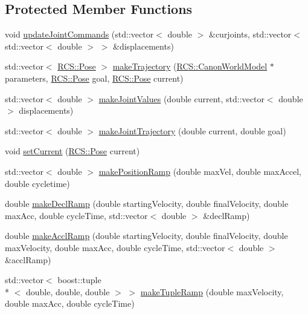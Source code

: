 \subsection*{Protected Member Functions}
\begin{DoxyCompactItemize}
\item 
void \hyperlink{classTrajectoryMaker_a59aedc924ba9fe197779bdd7c53ae97d}{update\-Joint\-Commands} (std\-::vector$<$ double $>$ \&curjoints, std\-::vector$<$ std\-::vector$<$ double $>$ $>$ \&displacements)
\item 
std\-::vector$<$ \hyperlink{namespaceRCS_aa07e45d8a50e30064283d2b38087f999}{R\-C\-S\-::\-Pose} $>$ \hyperlink{classTrajectoryMaker_a1d847a506d83927b677f7c123bebdf08}{make\-Trajectory} (\hyperlink{structRCS_1_1CanonWorldModel}{R\-C\-S\-::\-Canon\-World\-Model} $\ast$parameters, \hyperlink{namespaceRCS_aa07e45d8a50e30064283d2b38087f999}{R\-C\-S\-::\-Pose} goal, \hyperlink{namespaceRCS_aa07e45d8a50e30064283d2b38087f999}{R\-C\-S\-::\-Pose} current)
\item 
std\-::vector$<$ double $>$ \hyperlink{classTrajectoryMaker_a370d90dc48e1c3c864d669769ba38992}{make\-Joint\-Values} (double current, std\-::vector$<$ double $>$ displacements)
\item 
std\-::vector$<$ double $>$ \hyperlink{classTrajectoryMaker_aaf2b93827e39641e71c62cf7eb07623a}{make\-Joint\-Trajectory} (double current, double goal)
\item 
void \hyperlink{classTrajectoryMaker_aab45409e8775089ebd2eeb8c8bbb8b53}{set\-Current} (\hyperlink{namespaceRCS_aa07e45d8a50e30064283d2b38087f999}{R\-C\-S\-::\-Pose} current)
\item 
std\-::vector$<$ double $>$ \hyperlink{classTrajectoryMaker_ace8cc94b4579d784f19590c3bda77366}{make\-Position\-Ramp} (double max\-Vel, double max\-Accel, double cycletime)
\item 
double \hyperlink{classTrajectoryMaker_a6fb1afa338679f6251c5c557d985a41e}{make\-Decl\-Ramp} (double starting\-Velocity, double final\-Velocity, double max\-Acc, double cycle\-Time, std\-::vector$<$ double $>$ \&decl\-Ramp)
\item 
double \hyperlink{classTrajectoryMaker_a192ba138d9d818e58c0f6e9806f407d8}{make\-Accl\-Ramp} (double starting\-Velocity, double final\-Velocity, double max\-Velocity, double max\-Acc, double cycle\-Time, std\-::vector$<$ double $>$ \&accl\-Ramp)
\item 
std\-::vector$<$ boost\-::tuple\\*
$<$ double, double, double $>$ $>$ \hyperlink{classTrajectoryMaker_ac62b743efeb6bf7e0cb63d13423ca352}{make\-Tuple\-Ramp} (double max\-Velocity, double max\-Acc, double cycle\-Time)

\end{DoxyCompactItemize}
